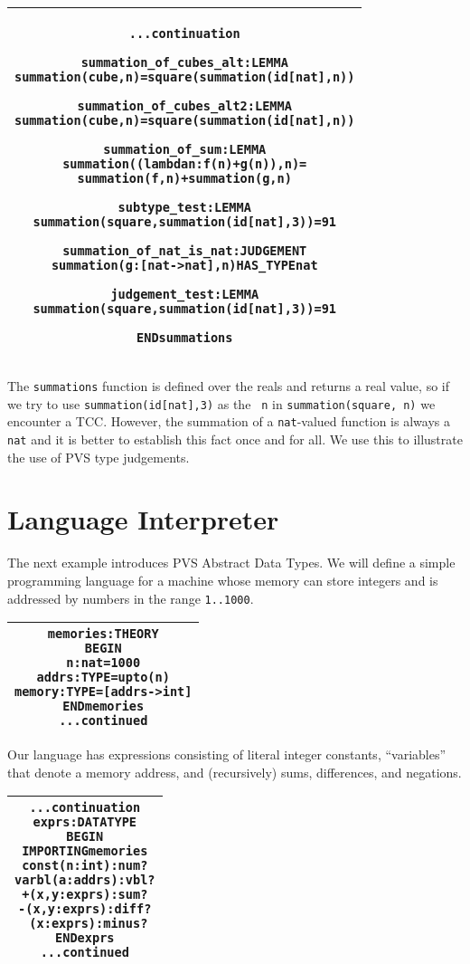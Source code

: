 \documentclass[11pt,twoside]{article}
\makeatletter
\def\sessionsize{\small}
\newlength{\hsbw}
\newenvironment{session}{\begin{flushleft}
  \def\baselinestretch{1}
 \setlength{\hsbw}{\linewidth}
 \addtolength{\hsbw}{-\arrayrulewidth}
 \addtolength{\hsbw}{-\tabcolsep}
 \begin{tabular}{@{}|c@{}|@{}}\hline 
 \begin{minipage}[b]{\hsbw}
 \begingroup\sessionsize\vspace*{1.2ex}\begin{alltt}}{\end{alltt}\endgroup\end{minipage}\\ \hline
 \end{tabular}
 \end{flushleft}}
\makeatother
\begin{document}
\begin{session}
...continuation

  summation_of_cubes_alt: LEMMA
    summation(cube, n) = square(summation(id[nat],n))

  summation_of_cubes_alt2: LEMMA
    summation(cube, n) = square(summation(id[nat],n))

  summation_of_sum: LEMMA
    summation((lambda n: f(n) + g(n)), n) = 
      summation(f, n) + summation(g, n)

  subtype_test: LEMMA
    summation(square, summation(id[nat],3)) = 91

  summation_of_nat_is_nat: JUDGEMENT
     summation(g:[nat->nat], n) HAS_TYPE nat

  judgement_test: LEMMA 
     summation(square, summation(id[nat], 3)) = 91

END summations
\end{session}
The {\tt summations} function is defined over the reals and returns a
real value, so if we try to use {\tt summation(id[nat],3)} as the {\tt
n} in {\tt summation(square, n)} we encounter a TCC.  However, the
summation of a {\tt nat}-valued function is always a {\tt nat} and it
is better to establish this fact once and for all.   We
use this to illustrate the use of PVS type judgements.

\section{Language Interpreter}

The next example introduces PVS Abstract Data Types.  We will define a
simple programming language for a machine whose memory can store
integers and is addressed by numbers in the range {\tt 1..1000}.

\begin{session}
memories: THEORY
BEGIN
  n: nat = 1000
  addrs: TYPE = upto(n)
  memory: TYPE = [addrs -> int]
END memories
...continued
\end{session}

Our language has expressions consisting of literal integer constants,
``variables'' that denote a memory address, and (recursively) sums,
differences, and negations.

\begin{session}
...continuation
exprs: DATATYPE
BEGIN
 IMPORTING memories
 const(n: int): num?
 varbl(a: addrs): vbl?
 +(x,y: exprs): sum?
 -(x,y: exprs): diff?
 ~(x: exprs): minus?
END exprs
...continued
\end{session}
\end{document}

